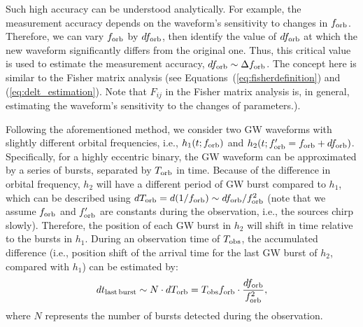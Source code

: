 \documentclass[%
 reprint,
 amsmath,amssymb,
 aps,
]{revtex4-2}
\newcommand{\xzy}[1]{\textcolor{red}{{\bf} #1}}
\begin{document}
Such high accuracy can be understood analytically. For example, the measurement accuracy depends on the waveform's sensitivity to changes in $f_{\rm orb}$. Therefore, we can vary $f_{\rm orb}$ by $d f_{\rm orb}$, then identify the value of $d f_{\rm orb}$ at which the new waveform significantly differs from the original one. Thus, this critical value is used to estimate the measurement accuracy, $d f_{\rm orb}\sim \Delta f_{\rm orb}$. The concept here is similar to the Fisher matrix analysis (see Equations~(\ref{eq:fisherdefinition}) and (\ref{eq:delt_estimation}). Note that $F_{ij}$ in the Fisher matrix analysis is, in general, estimating the waveform's sensitivity to the changes of parameters.). 




Following the aforementioned method, we consider two GW waveforms with slightly different orbital frequencies, i.e., $h_1(t;f_{\rm orb})$ and $h_2(t;f^{\prime}_{\rm orb}=f_{\rm orb}+d f_{\rm orb})$. Specifically, for a highly eccentric binary, the GW waveform can be approximated by a series of bursts, separated by $T_{\rm orb}$ in time. Because of the difference in orbital frequency, $h_2$ will have a different period of GW burst compared to $h_1$, which can be described using $d T_{\rm orb}=d(1/f_{\rm orb})\sim d f_{\rm orb}/f_{\rm orb}^2$ (note that we assume $f_{\rm orb}$ and $f^{\prime}_{\rm orb}$ are constants during the observation, i.e., the sources chirp slowly).
Therefore, the position of each GW burst in $h_2$ will shift in time relative to the bursts in $h_1$. During an observation time of $T_{\rm obs}$, the accumulated difference (i.e., position shift of the arrival time for the last GW burst of $h_2$, compared with $h_1$) can be estimated by:
\begin{equation}
   d t_{\rm last\, burst}  \sim N\cdot d T_{\rm orb} = T_{\rm obs}f_{\rm orb} \cdot \frac{d f_{\rm orb}}{f_{\rm orb}^2},\label{eq:dt lastburst}
\end{equation}
where $N$ represents the number of bursts detected during the observation.
\end{document}

